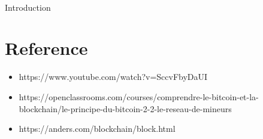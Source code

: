 \documentclass{article}
\begin{document}
\begin{center}
  \huge{\TermName}\\
  \LARGE Introduction
\end{center}
\section{Reference}
\begin{itemize}
\item https://www.youtube.com/watch?v=SccvFbyDaUI
\item https://openclassrooms.com/courses/comprendre-le-bitcoin-et-la-blockchain/le-principe-du-bitcoin-2-2-le-reseau-de-mineurs
\item https://anders.com/blockchain/block.html
\end{itemize}
\end{document}
